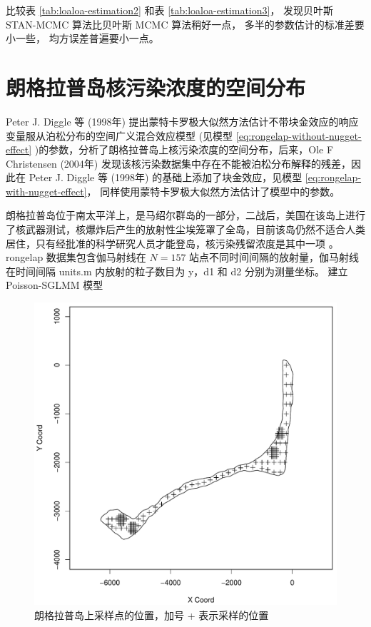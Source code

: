 \documentclass[12pt,a4paper,UTF8,twoside]{book}
\theoremstyle{definition}
\theoremstyle{definition}
\theoremstyle{definition}
\theoremstyle{remark}
\begin{document}
比较表 \ref{tab:loaloa-estimation2} 和表 \ref{tab:loaloa-estimation3}，
发现贝叶斯 STAN-MCMC 算法比贝叶斯 MCMC 算法稍好一点，
多半的参数估计的标准差要小一些， 均方误差普遍要小一点。

\hypertarget{case-rongelap}{%
\section{朗格拉普岛核污染浓度的空间分布}\label{case-rongelap}}

Peter J. Diggle 等 (1998年) \citep{Diggle1998}
提出蒙特卡罗极大似然方法估计不带块金效应的响应变量服从泊松分布的空间广义混合效应模型
(见模型 \eqref{eq:rongelap-without-nugget-effect}
)的参数，分析了朗格拉普岛上核污染浓度的空间分布，后来，Ole F Christensen
(2004年) \citep{Christensen2004}
发现该核污染数据集中存在不能被泊松分布解释的残差，因此在 Peter J. Diggle
等 (1998年) \citep{Diggle1998} 的基础上添加了块金效应，见模型
\eqref{eq:rongelap-with-nugget-effect}，
同样使用蒙特卡罗极大似然方法估计了模型中的参数。

朗格拉普岛位于南太平洋上，是马绍尔群岛的一部分，二战后，美国在该岛上进行了核武器测试，核爆炸后产生的放射性尘埃笼罩了全岛，目前该岛仍然不适合人类居住，只有经批准的科学研究人员才能登岛，核污染残留浓度是其中一项
\citep{Bordner2016}。rongelap 数据集包含伽马射线在 \(N=157\)
站点不同时间间隔的放射量，伽马射线在时间间隔 units.m 内放射的粒子数目为
y，d1 和 d2 分别为测量坐标。 建立 Poisson-SGLMM 模型

\begin{figure}

{\centering \includegraphics[width=0.7\linewidth]{figures/rongelap-island} 

}

\caption{朗格拉普岛上采样点的位置，加号 + 表示采样的位置}\label{fig:rongelap-dataset}
\end{figure}
\end{document}
